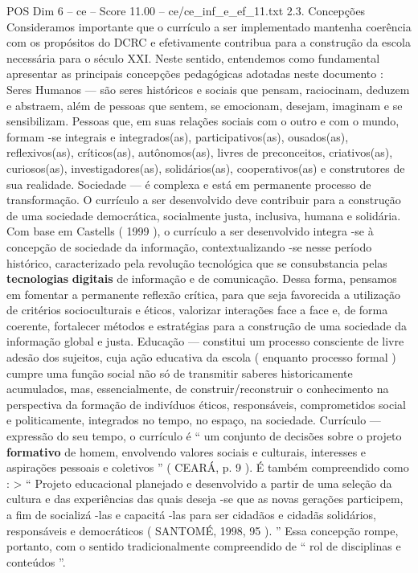 \begin{textsample}{POS Dim 6 – ce – Score 11.00 – ce/ce\_inf\_e\_ef\_11.txt}  \label{ex:f6_pos_034}
2.3.
Concepções Consideramos importante que o currículo a ser implementado mantenha coerência com os propósitos do DCRC e efetivamente contribua para a construção da escola necessária para o século XXI.
Neste sentido, entendemos como fundamental apresentar as principais concepções pedagógicas adotadas neste documento : Seres Humanos — são seres históricos e sociais que pensam, raciocinam, deduzem e abstraem, além de pessoas que sentem, se emocionam, desejam, imaginam e se sensibilizam.
Pessoas que, em suas relações sociais com o outro e com o mundo, formam -se integrais e integrados(as), participativos(as), ousados(as), reflexivos(as), críticos(as), autônomos(as), livres de preconceitos, criativos(as), curiosos(as), investigadores(as), solidários(as), cooperativos(as) e construtores de sua realidade.
Sociedade — é complexa e está em permanente processo de transformação.
O currículo a ser desenvolvido deve contribuir para a construção de uma sociedade democrática, socialmente justa, inclusiva, humana e solidária.
Com base em Castells ( 1999 ), o currículo a ser desenvolvido integra -se à concepção de sociedade da informação, contextualizando -se nesse período histórico, caracterizado pela revolução tecnológica que se consubstancia pelas \textbf{tecnologias} \textbf{digitais} de informação e de comunicação.
Dessa forma, pensamos em fomentar a permanente reflexão crítica, para que seja favorecida a utilização de critérios socioculturais e éticos, valorizar interações face a face e, de forma coerente, fortalecer métodos e estratégias para a construção de uma sociedade da informação global e justa.
Educação — constitui um processo consciente de livre adesão dos sujeitos, cuja ação educativa da escola ( enquanto processo formal ) cumpre uma função social não só de transmitir saberes historicamente acumulados, mas, essencialmente, de construir/reconstruir o conhecimento na perspectiva da formação de indivíduos éticos, responsáveis, comprometidos social e politicamente, integrados no tempo, no espaço, na sociedade.
Currículo — expressão do seu tempo, o currículo é “ um conjunto de decisões sobre o projeto \textbf{formativo} de homem, envolvendo valores sociais e culturais, interesses e aspirações pessoais e coletivos ” ( CEARÁ, p. 9 ).
É também compreendido como : > “ Projeto educacional planejado e desenvolvido a partir de uma seleção da cultura e das experiências das quais deseja -se que as novas gerações participem, a fim de socializá -las e capacitá -las para ser cidadãos e cidadãs solidários, responsáveis e democráticos ( SANTOMÉ, 1998, 95 ). ” Essa concepção rompe, portanto, com o sentido tradicionalmente compreendido de “ rol de disciplinas e conteúdos ”.

\end{textsample}
